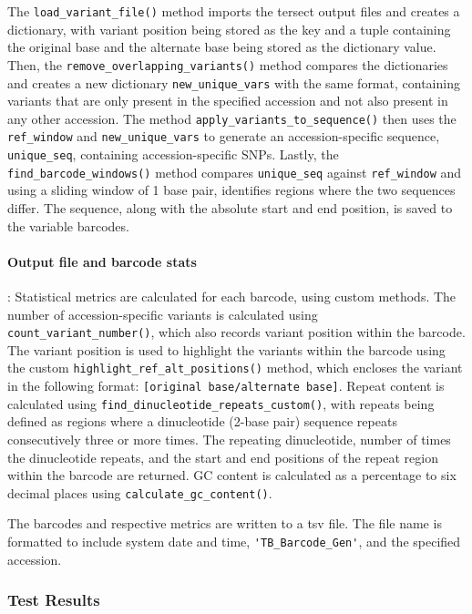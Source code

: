 \documentclass[12pt]{article}
\begin{document}
The \verb+load_variant_file()+ method imports the tersect output files and creates a dictionary, with variant position being stored as the key and a tuple containing the original base and the alternate base being stored as the dictionary value. Then, the \verb+remove_overlapping_variants()+ method compares the dictionaries and creates a new dictionary \verb+new_unique_vars+ with the same format, containing variants that are only present in the specified accession and not also present in any other accession. The method \verb+apply_variants_to_sequence()+ then uses the \verb+ref_window+ and \verb+new_unique_vars+ to generate an accession-specific sequence, \verb+unique_seq+, containing accession-specific SNPs. Lastly, the \verb+find_barcode_windows()+ method compares \verb+unique_seq+ against \verb+ref_window+ and using a sliding window of 1 base pair, identifies regions where the two sequences differ. The sequence, along with the absolute start and end position, is saved to the variable barcodes.  

\paragraph{Output file and barcode stats}: 
Statistical metrics are calculated for each barcode, using custom methods. The number of accession-specific variants is calculated using \verb+count_variant_number()+, which also records variant position within the barcode. The variant position is used to highlight the variants within the barcode using the custom \verb+highlight_ref_alt_positions()+ method, which encloses the variant in the following format: \verb+[original base/alternate base]+. Repeat content is calculated using \verb+find_dinucleotide_repeats_custom()+, with repeats being defined as regions where a dinucleotide (2-base pair) sequence repeats consecutively three or more times. The repeating dinucleotide, number of times the dinucleotide repeats, and the start and end positions of the repeat region within the barcode are returned. GC content is calculated as a percentage to six decimal places using \verb+calculate_gc_content()+. 

The barcodes and respective metrics are written to a tsv file. The file name is formatted to include system date and time, \verb+'TB_Barcode_Gen'+, and the specified accession. 

\subsubsection{Test Results}
\end{document}
